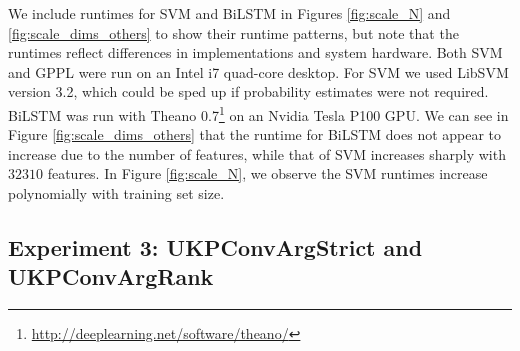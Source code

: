 We include runtimes for SVM and BiLSTM in Figures \ref{fig:scale_N} and
\ref{fig:scale_dims_others} to show their runtime patterns, but note that the runtimes reflect differences in implementations and system hardware.
Both SVM and GPPL were run on an Intel i7 quad-core desktop. For SVM we used LibSVM version 3.2, which could be sped up if probability estimates were not required.
BiLSTM was run with Theano 0.7\footnote{\url{http://deeplearning.net/software/theano/}} on an Nvidia Tesla P100 GPU. 
We can see in Figure \ref{fig:scale_dims_others} that the runtime for BiLSTM does
not appear to increase due to the number of features, while that of SVM increases sharply with $32310$ features. 
 In Figure \ref{fig:scale_N}, we observe the SVM runtimes increase polynomially with training set size. 

\subsection{Experiment 3: UKPConvArgStrict and UKPConvArgRank}

